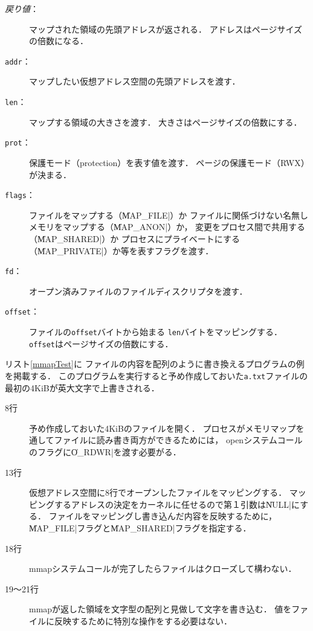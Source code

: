 \begin{description}
\item[\emph{戻り値}：]
  マップされた領域の先頭アドレスが返される．
  アドレスはページサイズの倍数になる．
\item[\texttt{addr}：]
  マップしたい仮想アドレス空間の先頭アドレスを渡す．
\item[\texttt{len}：]
  マップする領域の大きさを渡す．
  大きさはページサイズの倍数にする．
\item[\texttt{prot}：]
  保護モード（protection）を表す値を渡す．
  ページの保護モード（RWX）が決まる．
\item[\texttt{flags}：]
  ファイルをマップする（\|MAP_FILE|）か
  ファイルに関係づけない名無しメモリをマップする（\|MAP_ANON|）か，
  変更をプロセス間で共用する（\|MAP_SHARED|）か
  プロセスにプライベートにする（\|MAP_PRIVATE|）か等を表すフラグを渡す．
\item[\texttt{fd}：]
  オープン済みファイルのファイルディスクリプタを渡す．
\item[\texttt{offset}：]
  ファイルの\texttt{offset}バイトから始まる
  \texttt{len}バイトをマッピングする．
  \texttt{offset}はページサイズの倍数にする．
\end{description}

リスト\ref{mmapTest}に
ファイルの内容を配列のように書き換えるプログラムの例を掲載する．
このプログラムを実行すると予め作成しておいた\texttt{a.txt}ファイルの
最初の4KiBが英大文字で上書きされる．



\begin{description}
\item[8行] 予め作成しておいた4KiBのファイルを開く．
  プロセスがメモリマップを通してファイルに読み書き両方ができるためには，
  openシステムコールのフラグに\|O_RDWR|を渡す必要がる．
\item[13行] 仮想アドレス空間に8行でオープンしたファイルをマッピングする．
  マッピングするアドレスの決定をカーネルに任せるので第１引数は\|NULL|にする．
  ファイルをマッピングし書き込んだ内容を反映するために，
  \|MAP_FILE|フラグと\|MAP_SHARED|フラグを指定する．
\item[18行] mmapシステムコールが完了したらファイルはクローズして構わない．
\item[19〜21行] mmapが返した領域を文字型の配列と見做して文字を書き込む． 
  値をファイルに反映するために特別な操作をする必要はない．
\end{description}

